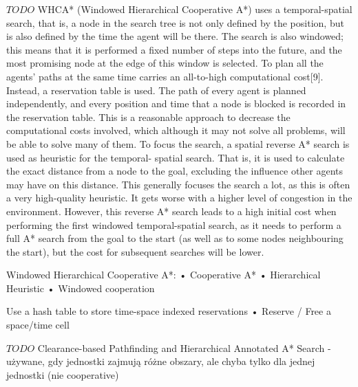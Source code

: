 $TODO$
WHCA* (Windowed Hierarchical Cooperative A*) uses a temporal-spatial search, that
is, a node in the search tree is not only defined by the position, but is also defined by the
time the agent will be there. The search is also windowed; this means that it is performed
a fixed number of steps into the future, and the most promising node at the edge of this
window is selected.
To plan all the agents' paths at the same time carries an all-to-high computational cost[9].
Instead, a reservation table is used. The path of every agent is planned independently, and
every position and time that a node is blocked is recorded in the reservation table. This is
a reasonable approach to decrease the computational costs involved, which although it may
not solve all problems, will be able to solve many of them.
To focus the search, a spatial reverse A* search is used as heuristic for the temporal-
spatial search. That is, it is used to calculate the exact distance from a node to the goal,
excluding the influence other agents may have on this distance. This generally focuses the
search a lot, as this is often a very high-quality heuristic. It gets worse with a higher level
of congestion in the environment.
However, this reverse A* search leads to a high initial cost when performing the first
windowed temporal-spatial search, as it needs to perform a full A* search from the goal
to the start (as well as to some nodes neighbouring the start), but the cost for subsequent
searches will be lower.
\cite{rtcooppathfinding}

Windowed Hierarchical Cooperative A*:
• Cooperative A*
• Hierarchical Heuristic
• Windowed cooperation

Use a hash table to store time-space indexed reservations
• Reserve / Free a space/time cell

$TODO$ Clearance-based Pathfinding and Hierarchical Annotated A* Search - używane, gdy jednostki zajmują różne obszary, ale chyba tylko dla jednej jednostki (nie cooperative)